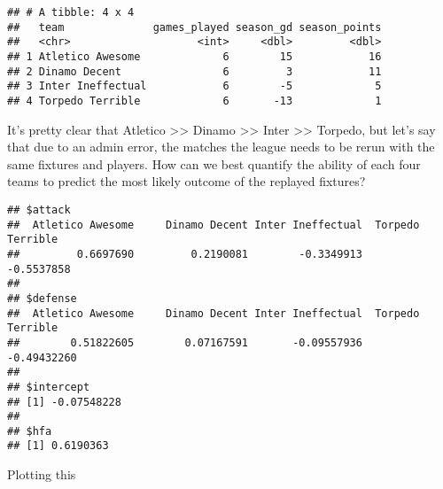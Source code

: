 \documentclass[]{article}
\newenvironment{Shaded}{\begin{snugshade}}{\end{snugshade}}
\newcommand{\KeywordTok}[1]{\textcolor[rgb]{0.13,0.29,0.53}{\textbf{#1}}}
\newcommand{\StringTok}[1]{\textcolor[rgb]{0.31,0.60,0.02}{#1}}
\newcommand{\CommentTok}[1]{\textcolor[rgb]{0.56,0.35,0.01}{\textit{#1}}}
\newcommand{\OperatorTok}[1]{\textcolor[rgb]{0.81,0.36,0.00}{\textbf{#1}}}
\newcommand{\NormalTok}[1]{#1}
\begin{document}
\begin{verbatim}
## # A tibble: 4 x 4
##   team              games_played season_gd season_points
##   <chr>                    <int>     <dbl>         <dbl>
## 1 Atletico Awesome             6        15            16
## 2 Dinamo Decent                6         3            11
## 3 Inter Ineffectual            6        -5             5
## 4 Torpedo Terrible             6       -13             1
\end{verbatim}

It's pretty clear that Atletico \textgreater{}\textgreater{} Dinamo
\textgreater{}\textgreater{} Inter \textgreater{}\textgreater{} Torpedo,
but let's say that due to an admin error, the matches the league needs
to be rerun with the same fixtures and players. How can we best quantify
the ability of each four teams to predict the most likely outcome of the
replayed fixtures?

\begin{Shaded}
\end{Shaded}

\begin{verbatim}
## $attack
##  Atletico Awesome     Dinamo Decent Inter Ineffectual  Torpedo Terrible 
##         0.6697690         0.2190081        -0.3349913        -0.5537858 
## 
## $defense
##  Atletico Awesome     Dinamo Decent Inter Ineffectual  Torpedo Terrible 
##        0.51822605        0.07167591       -0.09557936       -0.49432260 
## 
## $intercept
## [1] -0.07548228
## 
## $hfa
## [1] 0.6190363
\end{verbatim}

Plotting this
\end{document}

